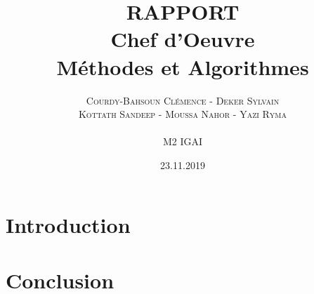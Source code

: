 \documentclass[a4paper,12pt]{report}
\title{\LARGE \textbf{RAPPORT\\ Chef d'O{e}uvre \\ Méthodes et Algorithmes }}
\author{\textsc{Courdy-Bahsoun Clémence - Deker Sylvain}\\
\textsc{Kottath Sandeep - Moussa Nahor - Yazi Ryma}\\\\
M2 IGAI  \\
}
\date{23.11.2019}
\begin{document}
\maketitle
\newpage


\section{Introduction} 





\section{Conclusion}
\end{document}

